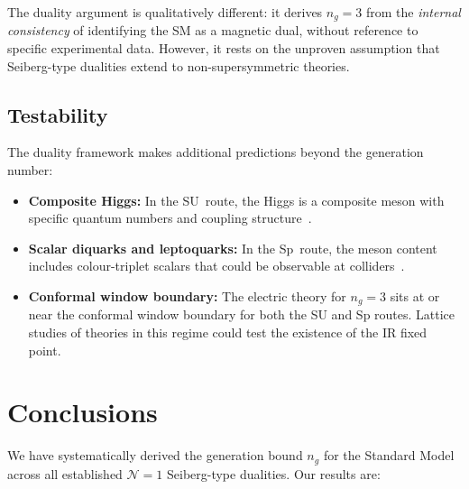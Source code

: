 \documentclass[11pt,a4paper]{article}
\theoremstyle{plain}
\theoremstyle{definition}
\theoremstyle{remark}
\newcommand{\ngen}{n_g}
\begin{document}
The duality argument is qualitatively different: it derives $\ngen = 3$
from the \emph{internal consistency} of identifying the SM as a magnetic
dual, without reference to specific experimental data.  However, it
rests on the unproven assumption that Seiberg-type dualities extend to
non-supersymmetric theories.

\subsection{Testability}

The duality framework makes additional predictions beyond the generation
number:
\begin{itemize}
  \item \textbf{Composite Higgs:} In the SU~route, the Higgs is a
    composite meson with specific quantum numbers and coupling
    structure~\cite{CacciapagliaSannino2024}.
  \item \textbf{Scalar diquarks and leptoquarks:} In the Sp~route, the
    meson content includes colour-triplet scalars that could be
    observable at colliders~\cite{Paper1}.
  \item \textbf{Conformal window boundary:} The electric theory for
    $\ngen = 3$ sits at or near the conformal window boundary for both
    the SU and Sp routes.  Lattice studies of theories in this
    regime could test the existence of the IR fixed point.
\end{itemize}


\section{Conclusions}
\label{sec:conclusions}

We have systematically derived the generation bound $\ngen$ for the
Standard Model across all established $\mathcal{N}=1$ Seiberg-type
dualities.  Our results are:
\end{document}
